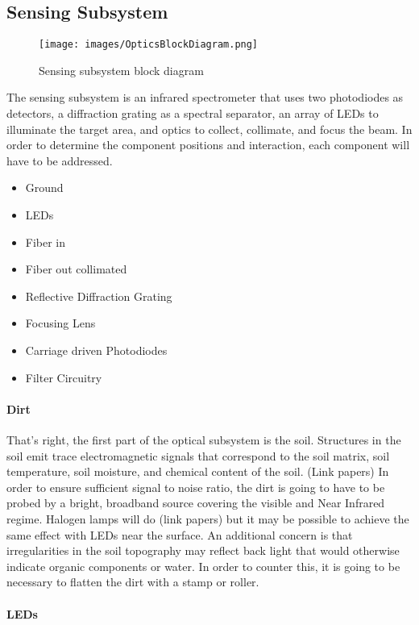 \subsection{Sensing Subsystem}
\begin{figure}[H]
    \caption{Sensing subsystem block diagram}
    \centering
    \texttt{[image: images/OpticsBlockDiagram.png]}
\end{figure}


The sensing subsystem is an infrared spectrometer that uses two photodiodes as detectors, a diffraction grating as a spectral separator, an array of LEDs to illuminate the target area, and optics to collect, collimate, and focus the beam. In order to determine the component positions and interaction, each component will have to be addressed.
    \begin{itemize}
        \item Ground
        \item LEDs
        \item Fiber in
        \item Fiber out collimated
        \item Reflective Diffraction Grating
        \item Focusing Lens
        \item Carriage driven Photodiodes
        \item Filter Circuitry
    \end{itemize}


    \paragraph{Dirt}

That’s right, the first part of the optical subsystem is the soil. Structures in the soil emit trace electromagnetic signals that correspond to the soil matrix, soil temperature, soil moisture, and chemical content of the soil. (Link papers)
In order to ensure sufficient signal to noise ratio, the dirt is going to have to be probed by a bright, broadband source covering the visible and Near Infrared regime. Halogen lamps will do (link papers) but it may be possible to achieve the same effect with LEDs near the surface. 
An additional concern is that irregularities in the soil topography may reflect back light that would otherwise indicate organic components or water. In order to counter this, it is going to be necessary to flatten the dirt with a stamp or roller.


\paragraph{LEDs}

